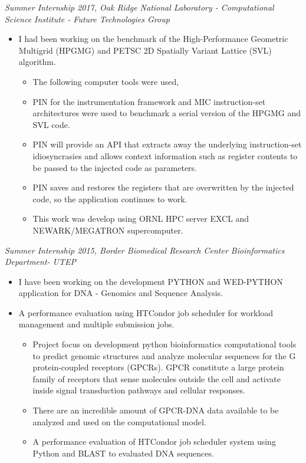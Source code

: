 \documentclass[margin]{res}
\begin{document}
\begin{resume}
{\sl Summer Internship 2017, Oak Ridge National Laboratory - Computational Science Institute - Future Technologies Group  }%
\begin{itemize}
\item I had been working on the benchmark of the High-Performance Geometric Multigrid (HPGMG) and PETSC 2D Spatially Variant Lattice (SVL) algorithm.
\begin{itemize}\itemsep -2pt
\item The following computer tools were used,  
\item PIN for the instrumentation framework and MIC instruction-set architectures were used to benchmark a serial version of the  HPGMG and SVL code.
\item PIN will provide an API that extracts away the underlying instruction-set idiosyncrasies and allows context information such as register contents to be passed to the injected code as parameters.
\item PIN saves and restores the registers that are overwritten by the injected code, so the application continues to work. 
\item This work was develop using ORNL HPC server EXCL and NEWARK/MEGATRON supercomputer.
\end{itemize}
\end{itemize}

{\sl Summer Internship 2015, Border Biomedical Research Center Bioinformatics Department- UTEP} %
\begin{itemize}\itemsep -2pt
\item I have been working on the development PYTHON and WED-PYTHON application for DNA - Genomics and Sequence Analysis.
\item A performance evaluation using HTCondor job scheduler for workload management and multiple submission jobs. 
\begin{itemize}
\item Project focus on development python bioinformatics computational tools to predict genomic structures and analyze molecular sequences
for the G protein-coupled receptors (GPCRs). GPCR constitute a large protein family of receptors that sense molecules outside the cell and activate inside signal transduction pathways and cellular responses.
\item There are an incredible amount of GPCR-DNA data available to be analyzed and used on the computational model.
\item A performance evaluation of HTCondor job scheduler system using Python and BLAST to evaluated DNA sequences. 
\end{itemize}


\end{itemize}
\end{resume}
\end{document}

